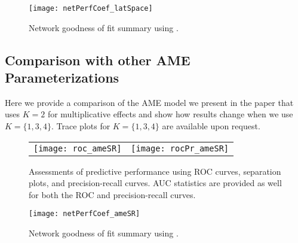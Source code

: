 \begin{figure}[ht]
	\centering
	\texttt{[image: netPerfCoef\_latSpace]}
	\caption{Network goodness of fit summary using .}
	\label{fig:netPerfCoef_latSpace}
\end{figure}

\FloatBarrier

\clearpage
\subsection{Comparison with other AME Parameterizations}
\label{sec:ameVsAmeAppendix}

Here we provide a comparison of the AME model we present in the paper that uses $K=2$ for multiplicative effects and show how results change when we use $K=\{1,3,4\}$. Trace plots for $K=\{1,3,4\}$ are available upon request.



\begin{figure}[ht]
	\centering
	\begin{tabular}{cc}
	\texttt{[image: roc\_ameSR]} & 
	\texttt{[image: rocPr\_ameSR]}
	\end{tabular}
	\caption{Assessments of predictive performance using ROC curves, separation plots, and precision-recall curves. AUC statistics are provided as well for both the ROC and precision-recall curves.}
	\label{fig:roc_ame}
\end{figure}

\begin{figure}[ht]
	\centering
	\texttt{[image: netPerfCoef\_ameSR]}
	\caption{Network goodness of fit summary using .}
	\label{fig:netPerfCoef_ameSR}
\end{figure}

\FloatBarrier


